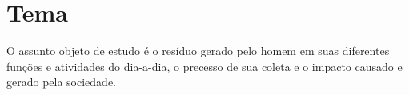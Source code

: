 \section{Tema}

  O assunto objeto de estudo é o resíduo gerado pelo homem em suas diferentes
  funções e atividades do dia-a-dia, o precesso de sua coleta e o
  impacto causado e gerado pela sociedade.
